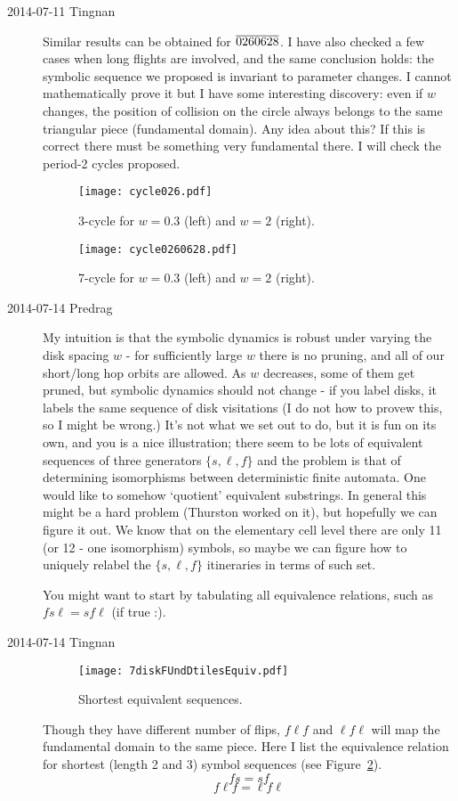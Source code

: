 \begin{description}
\item[2014-07-11 Tingnan]
Similar results can be obtained for ${\overline{0260628}}$. I have also
checked a few cases when long flights are involved, and the same
conclusion holds: the symbolic sequence we proposed is invariant to
parameter changes. I cannot mathematically prove it but I have some
interesting discovery: even if $w$ changes, the position of collision on
the circle always belongs to the same triangular piece (fundamental
domain). Any idea about this? If this is correct there must be something
very fundamental there. I will check the period-2 cycles proposed.

\begin{figure}
\texttt{[image: cycle026.pdf]}
\caption{3-cycle  for $w=0.3$ (left) and $w=2$ (right). }
\label{fig:cycle026}
\end{figure}

\begin{figure}
\texttt{[image: cycle0260628.pdf]}
\caption{7-cycle  for $w=0.3$ (left) and $w=2$ (right). }
\end{figure}

\item[2014-07-14 Predrag]
My intuition is that the symbolic dynamics is robust under varying
the disk spacing $w$ - for sufficiently large $w$ there is no pruning, and all
of our short/long hop orbits are allowed. As $w$ decreases, some of them get pruned,
but symbolic dynamics should not change - if you label disks, it labels the same
sequence of disk visitations (I do not how to provew this, so I might be wrong.)
It's not what we set out to do, but it is fun on its own,
and you  is a nice illustration; there seem to
be lots of equivalent sequences of three generators $\{s,\ell,f\}$ and
the problem is that of determining isomorphisms between deterministic
finite automata. One would like to somehow `quotient' equivalent
substrings. In general this might be a hard problem (Thurston worked on
it), but hopefully we can figure it out. We know that on the elementary
cell level there are only 11 (or 12 -  one isomorphism) symbols, so maybe
we can figure how to uniquely relabel the $\{s,\ell,f\}$ itineraries in
terms of such set.

You might want to start by tabulating all equivalence relations, such as
 $fs\ell = s f\ell$ (if true :).

\item[2014-07-14 Tingnan]
\begin{figure}
\texttt{[image: 7diskFUndDtilesEquiv.pdf]}
\caption{Shortest equivalent sequences.}
\label{fig:symbolEquiv}
\end{figure}
Though they have different number of flips, $f\ell f$ and $\ell f \ell$ will map the fundamental domain to the same piece. Here I list the equivalence relation for shortest (length 2 and 3) symbol sequences (see Figure~\ref{fig:symbolEquiv}).
\[
fs = sf
\]
\[
f\ell f=\ell f \ell
\]


\end{description}
